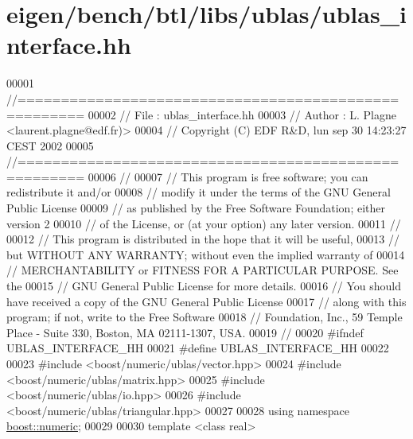 \hypertarget{eigen_2bench_2btl_2libs_2ublas_2ublas__interface_8hh_source}{}\section{eigen/bench/btl/libs/ublas/ublas\+\_\+interface.hh}
\label{eigen_2bench_2btl_2libs_2ublas_2ublas__interface_8hh_source}

\begin{DoxyCode}
00001 \textcolor{comment}{//=====================================================}
00002 \textcolor{comment}{// File   :  ublas\_interface.hh}
00003 \textcolor{comment}{// Author :  L. Plagne <laurent.plagne@edf.fr)>}
00004 \textcolor{comment}{// Copyright (C) EDF R&D,  lun sep 30 14:23:27 CEST 2002}
00005 \textcolor{comment}{//=====================================================}
00006 \textcolor{comment}{//}
00007 \textcolor{comment}{// This program is free software; you can redistribute it and/or}
00008 \textcolor{comment}{// modify it under the terms of the GNU General Public License}
00009 \textcolor{comment}{// as published by the Free Software Foundation; either version 2}
00010 \textcolor{comment}{// of the License, or (at your option) any later version.}
00011 \textcolor{comment}{//}
00012 \textcolor{comment}{// This program is distributed in the hope that it will be useful,}
00013 \textcolor{comment}{// but WITHOUT ANY WARRANTY; without even the implied warranty of}
00014 \textcolor{comment}{// MERCHANTABILITY or FITNESS FOR A PARTICULAR PURPOSE.  See the}
00015 \textcolor{comment}{// GNU General Public License for more details.}
00016 \textcolor{comment}{// You should have received a copy of the GNU General Public License}
00017 \textcolor{comment}{// along with this program; if not, write to the Free Software}
00018 \textcolor{comment}{// Foundation, Inc., 59 Temple Place - Suite 330, Boston, MA  02111-1307, USA.}
00019 \textcolor{comment}{//}
00020 \textcolor{preprocessor}{#ifndef UBLAS\_INTERFACE\_HH}
00021 \textcolor{preprocessor}{#define UBLAS\_INTERFACE\_HH}
00022 
00023 \textcolor{preprocessor}{#include <boost/numeric/ublas/vector.hpp>}
00024 \textcolor{preprocessor}{#include <boost/numeric/ublas/matrix.hpp>}
00025 \textcolor{preprocessor}{#include <boost/numeric/ublas/io.hpp>}
00026 \textcolor{preprocessor}{#include <boost/numeric/ublas/triangular.hpp>}
00027 
00028 \textcolor{keyword}{using namespace }\hyperlink{namespaceboost_1_1numeric}{boost::numeric};
00029 
00030 \textcolor{keyword}{template} <\textcolor{keyword}{class} real>

\end{DoxyCode}
